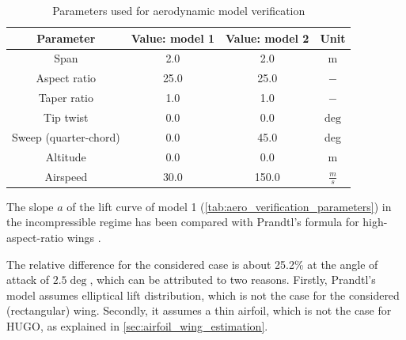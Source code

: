 \begin{table}[H]
    \centering
    \caption{Parameters used for aerodynamic model verification}
    \label{tab:aero_verification_parameters}
    \renewcommand{\arraystretch}{1.3}
    \begin{tabular}{|c|c|c|c|}
        \hline
        \textbf{Parameter} & \textbf{Value: model 1} & \textbf{Value: model 2} & \textbf{Unit} \\
        \hline\hline
       Span & 2.0 &2.0& m  \\\hline
       Aspect ratio & 25.0 &25.0& $-$  \\\hline
       Taper ratio&1.0 &1.0 &$-$ \\ \hline
       Tip twist &0.0&0.0&$\deg$\\\hline
       Sweep (quarter-chord) &0.0&45.0&deg\\\hline
       Altitude & 0.0 & 0.0&m  \\\hline
       Airspeed & 30.0& 150.0& $\frac{m}{s}$  \\\hline    
    \end{tabular}
\end{table}

The slope $a$ of the lift curve of model 1 (\autoref{tab:aero_verification_parameters}) in the incompressible regime has been compared with Prandtl's formula for high-aspect-ratio wings \cite[p. 443]{anderson2011ebook}.%

The relative difference for the considered case is about 25.2\% at the angle of attack of $2.5\deg$, which can be attributed to two reasons. Firstly, Prandtl's model assumes elliptical lift distribution, which is not the case for the considered (rectangular) wing. Secondly, it assumes a thin airfoil, which is not the case for HUGO, as explained in \autoref{sec:airfoil_wing_estimation}. 



